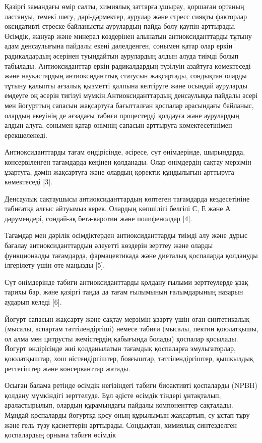Қазіргі замандағы өмір салты, химиялық заттарға ұшырау, қоршаған ортаның
ластануы, темекі шегу, дәрі-дәрмектер, аурулар және стресс сияқты
факторлар оксидативті стреске байланысты аурулардың пайда болу қаупін
арттырады. Өсімдік, жануар және минерал көздерінен алынатын
антиоксиданттарды тұтыну адам денсаулығына пайдалы екені дәлелденген,
сонымен қатар олар еркін радикалдардың әсерінен туындайтын аурулардың
алдын алуда тиімді болып табылады. Антиоксиданттар еркін радикалдардың
түзілуін азайтуға көмектеседі және науқастардың антиоксиданттық статусын
жақсартады, сондықтан оларды тұтыну қалыпты ағзалық қызметті қалпына
келтіруге және осындай ауруларды емдеуге оң әсерін тигізуі
мүмкін.Антиоксиданттардың денсаулыққа пайдалы әсері мен йогурттың
сапасын жақсартуға бағытталған қоспалар арасындағы байланыс, олардың
екеуінің де ағзадағы табиғи процестерді қолдауға және аурулардың алдын
алуға, сонымен қатар өнімнің сапасын арттыруға көмектесетінімен
ерекшеленеді.

Антиоксиданттарды тағам өндірісінде, әсіресе, сүт өнімдерінде,
шырындарда, консервіленген тағамдарда кеңінен қолданады. Олар өнімдердің
сақтау мерзімін ұзартуға, дәмін жақсартуға және олардың қоректік
құндылығын арттыруға көмектеседі {[}3{]}.

Денсаулық сақтаушысы антиоксиданттардың көптеген тағамдарда
кездесетініне табиғатқа алғыс айтуымыз керек. Олардың көпшілігі белгілі
С, Е және А дәрумендері, сондай-ақ бета-каротин және полифенолдар
{[}4{]}.

Тағамдар мен дәрілік өсімдіктерден антиоксиданттарды тиімді алу және
дұрыс бағалау антиоксиданттардың әлеуетті көздерін зерттеу және оларды
функционалды тағамдарда, фармацевтикада және диеталық қоспаларда
қолдануды ілгерілету үшін өте маңызды {[}5{]}.

Сүт өнімдерінде табиғи антиоксиданттарды қолдану ғылыми зерттеулерде
ұзақ тарихы бар, және қазіргі таңда да тағам ғылымының ғалымдарының
назарын аударып келеді {[}6{]}.

Йогурт сапасын жақсарту және сақтау мерзімін ұзарту үшін оған
синтетикалық (мысалы, аспартам тәттілендіргіші) немесе табиғи (мысалы,
пектин қоюлатқышы, ол алма мен цитрусты жемістердің қабығында болады)
қоспалар қосылады. Йогурт өндірісінде жиі қолданылатын тағамдық
қоспаларға эмульгаторлар, қоюлатқыштар, хош иістендіргіштер, бояғыштар,
тәттілендіргіштер, қышқылдық реттегіштер және консерванттар жатады.

Осыған балама ретінде өсімдік негізіндегі табиғи биоактивті қоспаларды
(NPBH) қолдану мүмкіндігі зерттелуде. Бұл әдісте өсімдік тіндері
ұнтақталып, араластырылып, олардың құрамындағы пайдалы компоненттер
сақталады. Мұндай қоспаларды йогуртқа қосу оның құрылымын жақсартып, су
ұстап тұру және гель түзу қасиеттерін арттырады. Сондықтан, химиялық
синтезделген қоспалардың орнына табиғи өсімдік

